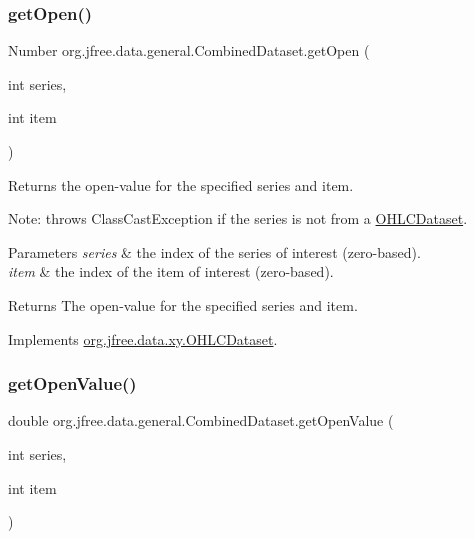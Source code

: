 \subsubsection{\texorpdfstring{get\+Open()}{getOpen()}}
{\footnotesize\ttfamily Number org.\+jfree.\+data.\+general.\+Combined\+Dataset.\+get\+Open (\begin{DoxyParamCaption}\item[{int}]{series,  }\item[{int}]{item }\end{DoxyParamCaption})}

Returns the open-\/value for the specified series and item. 

Note\+: throws {\ttfamily Class\+Cast\+Exception} if the series is not from a \mbox{\hyperlink{}{O\+H\+L\+C\+Dataset}}.


\begin{DoxyParams}{Parameters}
{\em series} & the index of the series of interest (zero-\/based). \\
\hline
{\em item} & the index of the item of interest (zero-\/based).\\
\hline
\end{DoxyParams}
\begin{DoxyReturn}{Returns}
The open-\/value for the specified series and item. 
\end{DoxyReturn}


Implements \mbox{\hyperlink{interfaceorg_1_1jfree_1_1data_1_1xy_1_1_o_h_l_c_dataset_a652f2a7a04925cc72472d390217fef08}{org.\+jfree.\+data.\+xy.\+O\+H\+L\+C\+Dataset}}.

\mbox{\label{classorg_1_1jfree_1_1data_1_1general_1_1_combined_dataset_a6f455c326e5f591bc1ef4b90b7bb4499}} 
\subsubsection{\texorpdfstring{get\+Open\+Value()}{getOpenValue()}}
{\footnotesize\ttfamily double org.\+jfree.\+data.\+general.\+Combined\+Dataset.\+get\+Open\+Value (\begin{DoxyParamCaption}\item[{int}]{series,  }\item[{int}]{item }\end{DoxyParamCaption})}

